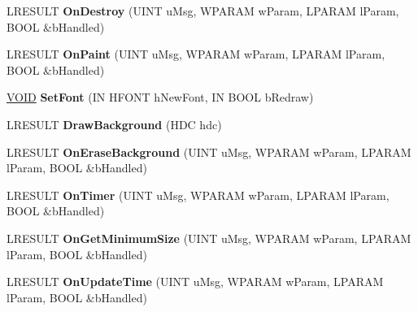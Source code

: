 \begin{DoxyCompactItemize}
\mbox{\label{class_c_tray_clock_wnd_af7e912d9771db35dc013569ad02609a9}} 
L\+R\+E\+S\+U\+LT {\bfseries On\+Destroy} (U\+I\+NT u\+Msg, W\+P\+A\+R\+AM w\+Param, L\+P\+A\+R\+AM l\+Param, B\+O\+OL \&b\+Handled)
\item 
\mbox{\label{class_c_tray_clock_wnd_acc178e269c071366d6c471ff906abcec}} 
L\+R\+E\+S\+U\+LT {\bfseries On\+Paint} (U\+I\+NT u\+Msg, W\+P\+A\+R\+AM w\+Param, L\+P\+A\+R\+AM l\+Param, B\+O\+OL \&b\+Handled)
\item 
\mbox{\label{class_c_tray_clock_wnd_aa61dd49022ad93b66917d9a5cf145492}} 
\hyperlink{interfacevoid}{V\+O\+ID} {\bfseries Set\+Font} (IN H\+F\+O\+NT h\+New\+Font, IN B\+O\+OL b\+Redraw)
\item 
\mbox{\label{class_c_tray_clock_wnd_a228cffcc2b693ace6298ce5b38e033ed}} 
L\+R\+E\+S\+U\+LT {\bfseries Draw\+Background} (H\+DC hdc)
\item 
\mbox{\label{class_c_tray_clock_wnd_a7b74338aa53f3b71f3fdc46cc97acf47}} 
L\+R\+E\+S\+U\+LT {\bfseries On\+Erase\+Background} (U\+I\+NT u\+Msg, W\+P\+A\+R\+AM w\+Param, L\+P\+A\+R\+AM l\+Param, B\+O\+OL \&b\+Handled)
\item 
\mbox{\label{class_c_tray_clock_wnd_ae64efe142d1bc9e533630f99521b4276}} 
L\+R\+E\+S\+U\+LT {\bfseries On\+Timer} (U\+I\+NT u\+Msg, W\+P\+A\+R\+AM w\+Param, L\+P\+A\+R\+AM l\+Param, B\+O\+OL \&b\+Handled)
\item 
\mbox{\label{class_c_tray_clock_wnd_ad79dcaece4df764da09b8ce1d6e31093}} 
L\+R\+E\+S\+U\+LT {\bfseries On\+Get\+Minimum\+Size} (U\+I\+NT u\+Msg, W\+P\+A\+R\+AM w\+Param, L\+P\+A\+R\+AM l\+Param, B\+O\+OL \&b\+Handled)
\item 
\mbox{\label{class_c_tray_clock_wnd_a6a8ed93446e7dec7ce7c24e978b0c871}} 
L\+R\+E\+S\+U\+LT {\bfseries On\+Update\+Time} (U\+I\+NT u\+Msg, W\+P\+A\+R\+AM w\+Param, L\+P\+A\+R\+AM l\+Param, B\+O\+OL \&b\+Handled)
\item 
\mbox{\label{class_c_tray_clock_wnd_ae4f57c7fa9e4d022189f1000c8bf4e1b}} 

\end{DoxyCompactItemize}
